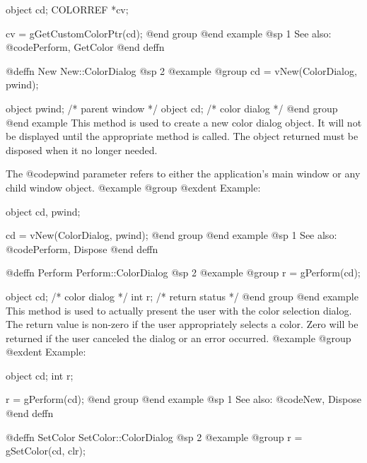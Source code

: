 object  cd;
COLORREF *cv;

cv = gGetCustomColorPtr(cd);
@end group
@end example
@sp 1
See also:  @code{Perform, GetColor}
@end deffn




















@deffn {New} New::ColorDialog
@sp 2
@example
@group
cd = vNew(ColorDialog, pwind);

object  pwind;  /*  parent window  */
object  cd;     /*  color dialog   */
@end group
@end example
This method is used to create a new color dialog object.  It will not be
displayed until the appropriate method is called.  The object returned
must be disposed when it no longer needed.

The @code{pwind} parameter refers to either the application's main window
or any child window object.
@example
@group
@exdent Example:

object  cd, pwind;

cd = vNew(ColorDialog, pwind);
@end group
@end example
@sp 1
See also:  @code{Perform, Dispose}
@end deffn









@deffn {Perform} Perform::ColorDialog
@sp 2
@example
@group
r = gPerform(cd);

object  cd;     /*  color dialog   */
int     r;      /*  return status  */
@end group
@end example
This method is used to actually present the user with the color
selection dialog.  The return value is non-zero if the user appropriately
selects a color.  Zero will be returned if the user canceled the dialog
or an error occurred.
@example
@group
@exdent Example:

object  cd;
int     r;

r = gPerform(cd);
@end group
@end example
@sp 1
See also:  @code{New, Dispose}
@end deffn









@deffn {SetColor} SetColor::ColorDialog
@sp 2
@example
@group
r = gSetColor(cd, clr);

